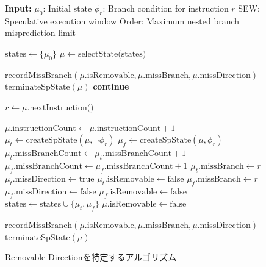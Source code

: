 \begin{figure}
  \begin{algorithm}[H]
    \caption{Removable Directionを特定するアルゴリズム}
    \label{algo_Unnecessary-branch}
\begin{algorithmic}
\State \textbf{Input:}
\State \hspace{1em} $\mu_0$: Initial state
\State \hspace{1em} $\phi_r$: Branch condition for instruction $r$
\State \hspace{1em} SEW: Speculative execution window
\State \hspace{1em} Order: Maximum nested branch misprediction limit

\State $\text{states} \gets \{ \mu_0 \}$
    \State $\mu \gets \text{selectState(states)}$

        \State $\text{recordMissBranch}(\mu.\text{isRemovable}, \mu.\text{missBranch}, \mu.\text{missDirection})$
        \State $\text{terminateSpState}(\mu)$
        \State \textbf{continue}
    \EndIf

    \State $r \gets \mu.\text{nextInstruction()}$

        \State $\mu.\text{instructionCount} \gets \mu.\text{instructionCount} + 1$
                \State $\mu_t \gets \text{createSpState}(\mu, \neg\phi_r)$
                \State $\mu_f \gets \text{createSpState}(\mu, \phi_r)$
                \State $\mu_t.\text{missBranchCount} \gets \mu_t.\text{missBranchCount} + 1$
                \State $\mu_f.\text{missBranchCount} \gets \mu_f.\text{missBranchCount} + 1$
                    \State $\mu_t.\text{missBranch} \gets r$
                    \State $\mu_t.\text{missDirection} \gets \text{true}$
                    \State $\mu_t.\text{isRemovable} \gets \text{false}$
                    \State $\mu_f.\text{missBranch} \gets r$
                    \State $\mu_f.\text{missDirection} \gets \text{false}$
                    \State $\mu_f.\text{isRemovable} \gets \text{false}$
                \EndIf
                \State $\text{states} \gets \text{states} \cup \{ \mu_t, \mu_f \}$
            \Else
                \State $\mu.\text{isRemovable} \gets \text{false}$
            \EndIf
        \EndIf

            \State $\text{recordMissBranch}(\mu.\text{isRemovable}, \mu.\text{missBranch}, \mu.\text{missDirection})$
            \State $\text{terminateSpState}(\mu)$
        \EndIf
    \EndIf
\EndWhile
\EndFunction
\end{algorithmic}
\end{algorithm}

\end{figure}


